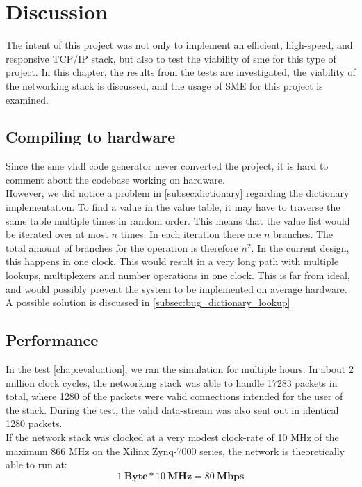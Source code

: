 \chapter{Discussion}
\label{chap:discussion}
The intent of this project was not only to implement an efficient, high-speed,
and responsive TCP/IP stack, but also to test the viability of \gls{sme} for
this type of project. In this chapter, the results from the tests are
investigated, the viability of the networking stack is discussed, and the usage
of SME for this project is examined.

\section{Compiling to hardware}\label{sec:compiling_to_hardware}
Since the \gls{sme} \gls{vhdl} code generator never converted the project, it is hard
to comment about the codebase working on hardware.\\
However, we did notice a problem in \autoref{subsec:dictionary} regarding
the dictionary implementation. To find a value in the value table, it may have
to traverse the same table multiple times in random order. This means that the
value list would be iterated over at most $n$ times. In each iteration there are
$n$ branches. The total amount of branches for the operation is therefore $n^2$.
In the current design, this happens in one clock. This would result in a very
long path with multiple lookups, multiplexers and number operations in one clock.
This is far from ideal, and would possibly prevent the system to be implemented
on average hardware.\\
A possible solution is discussed in \autoref{subsec:bug_dictionary_lookup}


\section{Performance}
In the test \autoref{chap:evaluation}, we ran the simulation for
multiple hours. In about 2 million clock cycles, the networking stack was able
to handle 17283 packets in total, where 1280 of the packets were valid
connections intended for the user of the stack. During the test, the valid
data-stream was also sent out in identical 1280 packets.\\ %
If the network stack was clocked at a very modest clock-rate of 10 MHz of the
maximum 866 MHz on the Xilinx Zynq-7000 series\cite{xilinx_zynq_7000}, the
network is theoretically able to run at:
$$1\:\mathbf{Byte}*10\:\mathbf{MHz}= 80\:\mathbf{Mbps}$$

